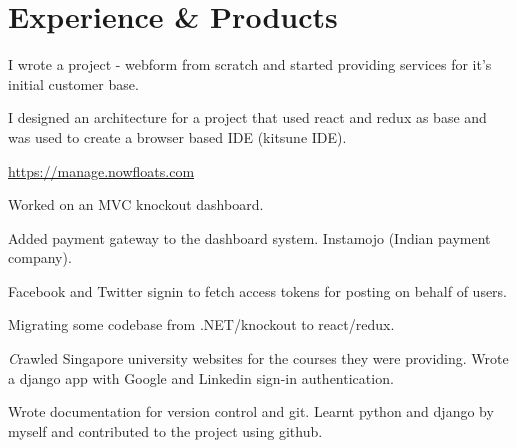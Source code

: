 \documentclass[]{deedy-resume-openfont}
\begin{document}
\hfill
\begin{minipage}[t]{0.66\textwidth}


\section{Experience \& Products}


\vspace{\topsep} %
\begin{tightemize}
\item I wrote a project - webform from scratch and started providing services for it's initial customer base.
\item I designed an architecture for a project that used react and redux as base and was used to create a browser based IDE (kitsune IDE).
\end{tightemize}
\sectionsep


{ \url{ https://manage.nowfloats.com } }\\
\begin{tightemize}
\item Worked on an MVC knockout dashboard.
\item Added payment gateway to the dashboard system. Instamojo (Indian payment company).
\item Facebook and Twitter signin to fetch access tokens for posting on behalf of users.
\item Migrating some codebase from .NET/knockout to react/redux.
\vspace{\topsep} %
\end{tightemize}

\begin{tightemize}
\item \emph Crawled Singapore university websites for the courses they were providing. Wrote a django app with Google and Linkedin sign-in authentication. \end{tightemize}
\sectionsep

\vspace{\topsep} %
\begin{tightemize}
\item Wrote documentation for version control and git. Learnt python and django by myself and contributed to the project using github.\end{tightemize}
\sectionsep



\end{minipage}
\end{document}

